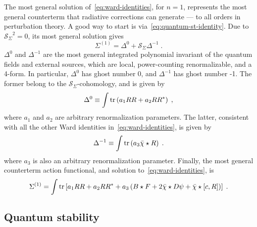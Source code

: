 \documentclass[../main.tex]{subfiles}
\begin{document}
The most general solution of~\eqref{eq:ward-identities}, for $n=1$, represents the most general counterterm that radiative corrections can generate --- to all orders in perturbation theory. A good way to start is via~\eqref{eq:quantum-st-identity}. Due to $ {\mathcal{S}_{\Sigma}}^{ 2 } = 0 $, its most general solution gives
\begin{equation}
  \label{eq:solution-to-quantum-st}
  \Sigma^{ (1) } = \Delta^0 + \mathcal{S}_{ \Sigma } \Delta^{ -1 }\;.
\end{equation}
$ \Delta^0 $ and $ \Delta^{ -1 } $ are the most general integrated polynomial invariant of the quantum fields and external sources, which are local, power-counting renormalizable, and a 4-form. In particular, $ \Delta^0 $ has ghost number 0, and $ \Delta^{ -1 } $ has ghost number -1. The former belong to the $ \mathcal{S}_{ \Sigma } $-cohomology, and is given by
\begin{equation}
  \label{eq:delta0}
  \Delta^0 \equiv \int \operatorname{tr} \left( a_1 RR + a_2 RR^* \right) \;,
\end{equation}
where $ a_1 $ and $ a_2 $ are arbitrary renormalization parameters. The latter, consistent with all the other Ward identities in~\eqref{eq:ward-identities}, is given by
\begin{equation}
  \label{eq:delta-1}
  \Delta^{-1} \equiv \int \operatorname{tr} \left( a_3 \bar{ \chi } \star R \right) \;.
\end{equation}
where $ a_3 $ is also an arbitrary renormalization parameter. Finally, the most general counterterm action functional, and solution to~\eqref{eq:ward-identities}, is
\begin{equation}
  \label{eq:ct-action}
  \Sigma^{ (1) } = \int \operatorname{tr} \left[ a_1 RR + a_2 RR^* + a_3 \left( B \star F + 2 \bar{ \chi } \star D \psi + \bar{ \chi } \star \left[ c, R \right] \right) \right] \;.
\end{equation}

\subsection{Quantum stability}\label{sec:stability;sec:quantum}
\end{document}
